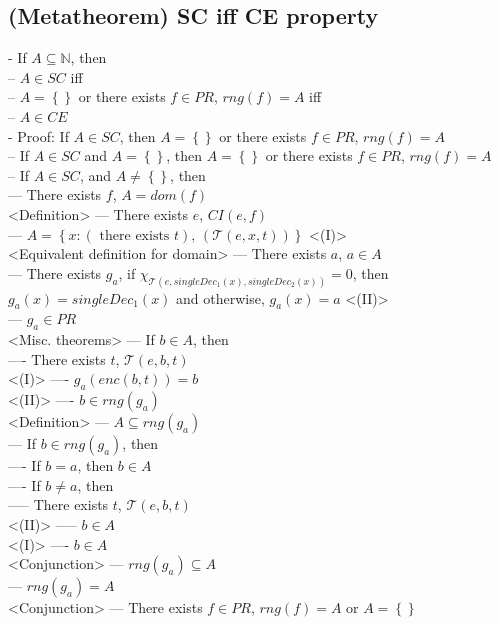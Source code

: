 \documentclass{book}
\newcommand{\inot}{\not}
\newcommand{\txtexists}[2]{\left(\text{ there exists }#1\right)\text{, }\left(#2\right)}
\newcommand{\set}[1]{\left\{ #1 \right\}}
\begin{document}
\subsection{(Metatheorem) SC iff CE property} %
	- If $A \subseteq \mathbb{N}$, then \\
		-- $A \in SC$ iff \\
		-- $A = \set{}$ or there exists $f \in PR$, $rng(f) = A$ iff \\
		-- $A \in CE$ \\
	- Proof: If $A \in SC$, then $A = \set{}$ or there exists $f \in PR$, $rng(f) = A$ \\
		-- If $A \in SC$ and $A = \set{}$, then $A = \set{}$ or there exists $f \in PR$, $rng(f) = A$ \\
		-- If $A \in SC$, and $A \inot = \set{}$, then \\
			--- There exists $f$, $A = dom(f)$ \\ <Definition>
			--- There exists $e$, $CI(e, f)$ \\
			--- $A = \set{x: \txtexists{t}{\mathcal{T}(e, x, t)}}$ <(I)> \\ <Equivalent definition for domain>
			--- There exists $a$, $a \in A$ \\
			--- There exists $g_a$, if $\chi_{\mathcal{T}(e, singleDec_1(x), singleDec_2(x))} = 0$, then $g_a(x) = singleDec_1(x)$ and otherwise, $g_a(x) = a$ <(II)> \\
			--- $g_a \in PR$ \\ <Misc. theorems>
			--- If $b \in A$, then \\
				---- There exists $t$, $\mathcal{T}(e, b, t)$ \\ <(I)>
				---- $g_a(enc(b, t)) = b$ \\ <(II)>
				---- $b \in rng(g_a)$ \\ <Definition>
			--- $A \subseteq rng(g_a)$ \\
			--- If $b \in rng(g_a)$, then \\
				---- If $b = a$, then $b \in A$ \\
				---- If $b \inot = a$, then \\
					----- There exists $t$, $\mathcal{T}(e, b, t)$ \\ <(II)>
					----- $b \in A$ \\ <(I)>
				---- $b \in A$ \\ <Conjunction>
			--- $rng(g_a) \subseteq A$ \\
			--- $rng(g_a) = A$ \\ <Conjunction>
			--- There exists $f \in PR$, $rng(f) = A$ or $A = \set{}$ \\
\end{document}
